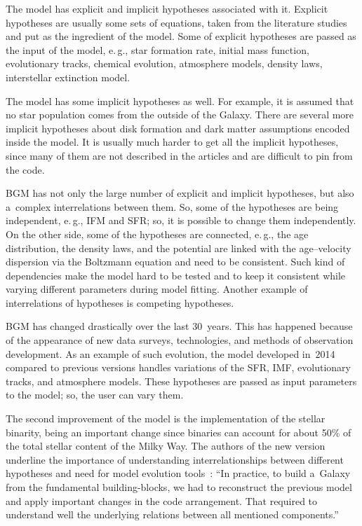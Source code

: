 \begin{multicols}{2}
  The model has explicit and implicit hypotheses associated with it. Explicit
hypotheses are usually some sets of equations, taken from the literature studies and
put as the ingredient of the model. Some of explicit hypotheses are passed as the
input of the model, e.\,g., star formation rate, initial mass function, evolutionary
tracks, chemical evolution, atmosphere models, density laws, interstellar extinction
model.

  The model has some implicit hypotheses as well. For example, it is assumed that
no star population comes from the outside of the Galaxy. There are several more
implicit hypotheses about disk formation and dark matter assumptions encoded inside
the model. It is usually much harder to get all the implicit hypotheses, since many of
them are not described in the articles and are difficult to pin from the code.

  BGM has not only the large number of explicit and implicit hypotheses, but also a~complex interrelations between them. So, some of the hypotheses are being
independent, e.\,g., IFM and SFR; so, it is possible to change them independently. On
the other side, some of the hypotheses are connected, e.\,g., the age distribution,
the density laws, and the potential are linked with the age--velocity dispersion via the
Boltzmann equation and need to be consistent. Such kind of dependencies make the
model hard to be tested and to keep it consistent while varying different parameters
during model fitting. Another example of interrelations of hypotheses is competing
hypotheses.

  BGM has changed drastically over the last 30~years. This has happened because of
the appearance of new data surveys, technologies, and methods of observation
development. As an example of such evolution, the model developed in~2014
compared to previous versions handles variations of the SFR, IMF, evolutionary
tracks, and atmosphere models. These hypotheses are passed as input parameters to
the model; so, the user can vary them.

The second improvement of the model is the
implementation of the stellar binarity, being an important change since binaries can
account for about 50\% of the total stellar content of the Milky Way. The authors of
the new version underline the importance of understanding interrelationships between
different hypotheses and need for model evolution tools~\cite{60-kl}: ``In practice, to build a~Galaxy from the fundamental building-blocks, we had to reconstruct the previous
model and apply important changes in the code arrangement. That required to
understand well the underlying relations between all mentioned
components.''


\end{multicols}
